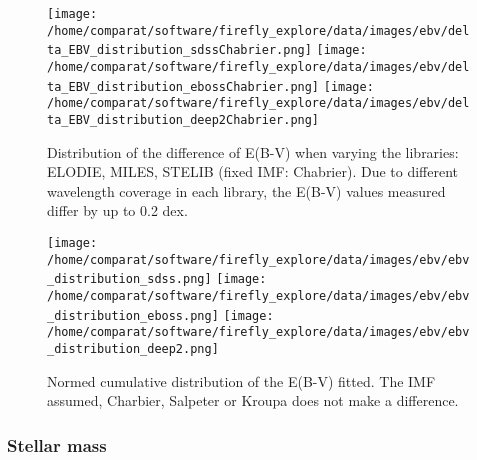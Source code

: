 \documentclass[onecolumn]{aa}
\begin{document}
\begin{figure}
\begin{center}
\caption{\label{fig:distributions:EBV} 
Distribution of the difference of E(B-V) when varying the libraries: ELODIE, MILES, STELIB (fixed IMF: Chabrier).
Due to different wavelength coverage in each library, the E(B-V) values measured differ by up to 0.2 dex.
}  
\texttt{[image: /home/comparat/software/firefly\_explore/data/images/ebv/delta\_EBV\_distribution\_sdssChabrier.png]}
\hspace*{-0.6cm}
\texttt{[image: /home/comparat/software/firefly\_explore/data/images/ebv/delta\_EBV\_distribution\_ebossChabrier.png]}
\hspace*{-0.6cm}
\texttt{[image: /home/comparat/software/firefly\_explore/data/images/ebv/delta\_EBV\_distribution\_deep2Chabrier.png]}
\end{center}
\end{figure}

\begin{figure}
\begin{center}
\caption{\label{fig:distributions:EBV2} 
Normed cumulative distribution of the E(B-V) fitted. The IMF assumed, Charbier, Salpeter or Kroupa does not make a difference. 
}  \texttt{[image: /home/comparat/software/firefly\_explore/data/images/ebv/ebv\_distribution\_sdss.png]}
\hspace*{-0.6cm}
\texttt{[image: /home/comparat/software/firefly\_explore/data/images/ebv/ebv\_distribution\_eboss.png]}          
\hspace*{-0.6cm}
\texttt{[image: /home/comparat/software/firefly\_explore/data/images/ebv/ebv\_distribution\_deep2.png]} 
\end{center}
\end{figure}


\subsubsection{Stellar mass}
\label{subsec:mass}
\end{document}
